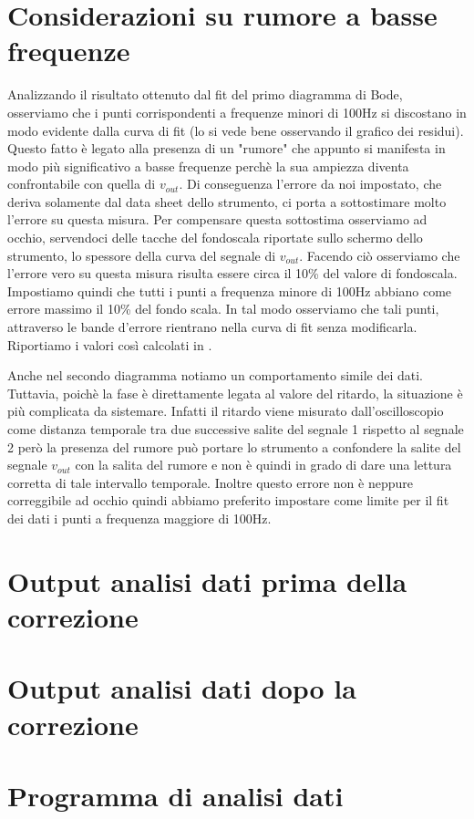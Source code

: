 \documentclass[
    rmp,
    reprint, 
    superscriptaddress, 
    altaffilletter, 
    amsmath, 
    amssymb, 
    a4paper]{revtex4-2}
\begin{document}
\section{Considerazioni su rumore a basse frequenze}
\label{sec:correction}

Analizzando il risultato ottenuto dal fit del primo diagramma di Bode, osserviamo che i punti corrispondenti a frequenze minori di 100Hz si discostano in modo evidente dalla curva di fit (lo si vede bene osservando il grafico dei residui). Questo fatto è legato alla presenza di un "rumore" che appunto si manifesta in modo più significativo a basse frequenze perchè la sua ampiezza diventa confrontabile con quella di $v_{out}$. Di conseguenza l'errore da noi impostato, che deriva solamente dal data sheet dello strumento, ci porta a sottostimare molto l'errore su questa misura. Per compensare questa sottostima osserviamo ad occhio, servendoci delle tacche del fondoscala riportate sullo schermo dello strumento, lo spessore della curva del segnale di $v_{out}$. Facendo ciò osserviamo che l'errore vero su questa misura risulta essere circa il 10\% del valore di fondoscala. Impostiamo quindi che tutti i punti a frequenza minore di 100Hz abbiano come errore massimo il 10\% del fondo scala. In tal modo osserviamo che tali punti, attraverso le bande d'errore rientrano nella curva di fit senza modificarla. Riportiamo i valori così calcolati in .

Anche nel secondo diagramma notiamo un comportamento simile dei dati. Tuttavia, poichè la fase è direttamente legata al valore del ritardo, la situazione è più complicata da sistemare. Infatti il ritardo viene misurato dall'oscilloscopio come distanza temporale tra due successive salite del segnale 1 rispetto al segnale 2 però la presenza del rumore può portare lo strumento a confondere la salite del segnale $v_{out}$ con la salita del rumore e non è quindi in grado di dare una lettura corretta di tale intervallo temporale. Inoltre questo errore non è neppure correggibile ad occhio quindi abbiamo preferito impostare come limite per il fit dei dati i punti a frequenza maggiore di 100Hz.


\onecolumngrid
\appendix

\setcounter{table}{0}
\renewcommand{\thetable}{A-\Roman{table}}
\newpage
\section{Output analisi dati prima della correzione}
\label{appendix:output}

\section{Output analisi dati dopo la correzione}
\label{appendix:out_correct}

\section{Programma di analisi dati}

\end{document}
